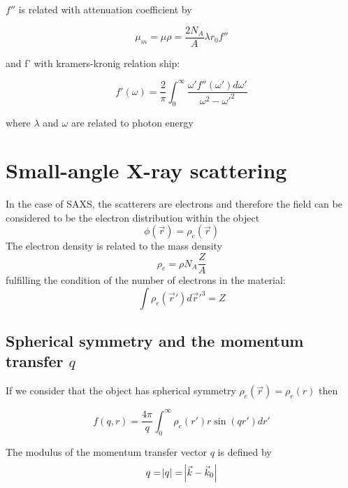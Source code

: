 $f''$ is related with attenuation coefficient by

\begin{equation}
        \mu_m=\mu \rho = \frac{2 N_A}{A} \lambda r_0 f''
\end{equation}

and f' with kramers-kronig relation ship:

\begin{equation}
        f'(\omega) = \frac{2}{\pi} \int_0^{\infty} \frac{\omega'f''(\omega')d\omega'}{\omega^2-\omega'^2}
\end{equation}

where $\lambda$ and $\omega$ are related to  photon energy


\section{Small-angle X-ray scattering}

In the case of SAXS, the scatterers are electrons and therefore the field can be considered to be the electron distribution within the object
\begin{equation}
       \phi(\vec{r})=\rho_e(\vec{r})
\end{equation}
The electron density is related to the mass density
\begin{equation}
        \rho_e = \rho N_A \frac{Z}{A}
\end{equation}
fulfilling the condition of the number of electrons in the material:
\begin{equation}
        \int \rho_e(\vec{r}')  d\vec{r}'^3 = Z
\end{equation}

\subsection{Spherical symmetry and the momentum transfer $q$}

If we consider that the object has spherical symmetry $\rho_e(\vec{r})=\rho_e(r)$ then

\begin{equation}
       f(q,r)=\frac{4\pi}{q} \int_0^{\infty} \rho_e(r') r \sin(qr')  dr'
\end{equation}

The modulus of the momentum transfer vector $q$ is defined by
\begin{equation}
       q=\abs{q}=\abs{\vec{k} - \vec{k}_0}
\end{equation}

